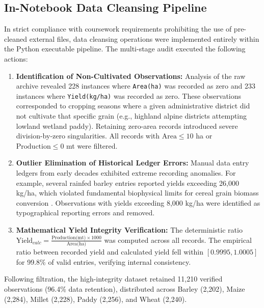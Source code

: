 \documentclass[conference]{IEEEtran}
\begin{document}
\subsection{In-Notebook Data Cleansing Pipeline}
In strict compliance with coursework requirements prohibiting the use of pre-cleaned external files, data cleansing operations were implemented entirely within the Python executable pipeline. The multi-stage audit executed the following actions:
\begin{enumerate}
    \item \textbf{Identification of Non-Cultivated Observations:} Analysis of the raw archive revealed 228 instances where \texttt{Area(ha)} was recorded as zero and 233 instances where \texttt{Yield(kg/ha)} was recorded as zero. These observations corresponded to cropping seasons where a given administrative district did not cultivate that specific grain (e.g., highland alpine districts attempting lowland wetland paddy). Retaining zero-area records introduced severe division-by-zero singularities. All records with $\text{Area} \le 10$ ha or $\text{Production} \le 0$ mt were filtered.
    \item \textbf{Outlier Elimination of Historical Ledger Errors:} Manual data entry ledgers from early decades exhibited extreme recording anomalies. For example, several rainfed barley entries reported yields exceeding 26,000 kg/ha, which violated fundamental biophysical limits for cereal grain biomass conversion \cite{lobell2008}. Observations with yields exceeding 8,000 kg/ha were identified as typographical reporting errors and removed.
    \item \textbf{Mathematical Yield Integrity Verification:} The deterministic ratio $\text{Yield}_{calc} = \frac{\text{Production(mt)} \times 1000}{\text{Area(ha)}}$ was computed across all records. The empirical ratio between recorded yield and calculated yield fell within $[0.9995, 1.0005]$ for 99.8\% of valid entries, verifying internal consistency.
\end{enumerate}

Following filtration, the high-integrity dataset retained 11,210 verified observations (96.4\% data retention), distributed across Barley (2,202), Maize (2,284), Millet (2,228), Paddy (2,256), and Wheat (2,240).
\end{document}
